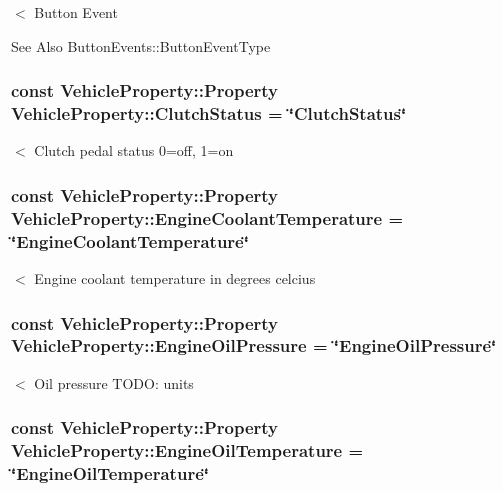$<$ Button Event \begin{DoxySeeAlso}{See Also}
Button\-Events\-::\-Button\-Event\-Type 
\end{DoxySeeAlso}
\hypertarget{classVehicleProperty_acdca2ca718fd392c7ad9b8adc817baec}{
\subsubsection[{Clutch\-Status}]{\setlength{\rightskip}{0pt plus 5cm}const Vehicle\-Property\-::\-Property Vehicle\-Property\-::\-Clutch\-Status = \char`\"{}Clutch\-Status\char`\"{}\hspace{0.3cm}{\ttfamily [static]}}}\label{classVehicleProperty_acdca2ca718fd392c7ad9b8adc817baec}
$<$ Clutch pedal status 0=off, 1=on \hypertarget{classVehicleProperty_ae4f240ad9cecbbb9d0cb3a615865b60a}{
\subsubsection[{Engine\-Coolant\-Temperature}]{\setlength{\rightskip}{0pt plus 5cm}const Vehicle\-Property\-::\-Property Vehicle\-Property\-::\-Engine\-Coolant\-Temperature = \char`\"{}Engine\-Coolant\-Temperature\char`\"{}\hspace{0.3cm}{\ttfamily [static]}}}\label{classVehicleProperty_ae4f240ad9cecbbb9d0cb3a615865b60a}
$<$ Engine coolant temperature in degrees celcius \hypertarget{classVehicleProperty_ab7fad273c7149dbd338f53f2536aca26}{
\subsubsection[{Engine\-Oil\-Pressure}]{\setlength{\rightskip}{0pt plus 5cm}const Vehicle\-Property\-::\-Property Vehicle\-Property\-::\-Engine\-Oil\-Pressure = \char`\"{}Engine\-Oil\-Pressure\char`\"{}\hspace{0.3cm}{\ttfamily [static]}}}\label{classVehicleProperty_ab7fad273c7149dbd338f53f2536aca26}
$<$ Oil pressure T\-O\-D\-O\-: units \hypertarget{classVehicleProperty_a9d4a610d94b12f139ea00b271804a73f}{
\subsubsection[{Engine\-Oil\-Temperature}]{\setlength{\rightskip}{0pt plus 5cm}const Vehicle\-Property\-::\-Property Vehicle\-Property\-::\-Engine\-Oil\-Temperature = \char`\"{}Engine\-Oil\-Temperature\char`\"{}\hspace{0.3cm}{\ttfamily [static]}}}\label{classVehicleProperty_a9d4a610d94b12f139ea00b271804a73f}
